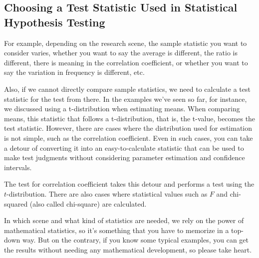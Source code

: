 \documentclass{ltjsbook}
\begin{document}
\subsection{Choosing a Test Statistic Used in Statistical Hypothesis Testing}
For example, depending on the research scene, the sample statistic you want to consider varies, whether you want to say the average is different, the ratio is different, there is meaning in the correlation coefficient, or whether you want to say the variation in frequency is different, etc.

Also, if we cannot directly compare sample statistics, we need to calculate a test statistic for the test from there. In the examples we've seen so far, for instance, we discussed using a t-distribution when estimating means. When comparing means, this statistic that follows a t-distribution, that is, the t-value, becomes the test statistic.
However, there are cases where the distribution used for estimation is not simple, such as the correlation coefficient. Even in such cases, you can take a detour of converting it into an easy-to-calculate statistic that can be used to make test judgments without considering parameter estimation and confidence intervals.

The test for correlation coefficient takes this detour and performs a test using the $t$-distribution. There are also cases where statistical values such as $F$ and chi-squared (also called chi-square) are calculated.

In which scene and what kind of statistics are needed, we rely on the power of mathematical statistics, so it's something that you have to memorize in a top-down way. But on the contrary, if you know some typical examples, you can get the results without needing any mathematical development, so please take heart.
\end{document}
